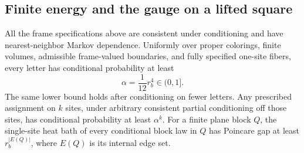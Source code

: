 \subsection{Finite energy and the gauge on a lifted square}

\begin{lemma}\label{l:planeenergy}
All the frame specifications above are consistent under conditioning
and have nearest-neighbor Markov dependence. Uniformly over proper
colorings, finite volumes, admissible frame-valued boundaries, and
fully specified one-site fibers, every letter has conditional
probability at least
\[
 \alpha=\frac1{12}r_b^4\in(0,1].
\]
The same lower bound holds after conditioning on fewer letters.
Any prescribed assignment on \(k\) sites, under arbitrary consistent
partial conditioning off those sites, has conditional probability
at least \(\alpha^k\).
For a finite plane block \(Q\), the single-site heat bath of every conditional block law in \(Q\) has Poincare gap at least
\(r_b^{|E(Q)|}\), where \(E(Q)\) is its internal edge set.
\end{lemma}

